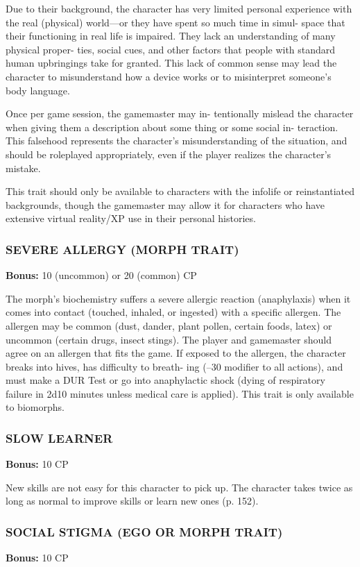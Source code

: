 Due to their background, the character has very
limited personal experience with the real (physical)
world—or they have spent so much time in simul-
space that their functioning in real life is impaired.
They lack an understanding of many physical proper-
ties, social cues, and other factors that people with
standard human upbringings take for granted. This
lack of common sense may lead the character to
misunderstand how a device works or to misinterpret
someone’s body language.

Once per game session, the gamemaster may in-
tentionally mislead the character when giving them
a description about some thing or some social in-
teraction. This falsehood represents the character’s
misunderstanding of the situation, and should be
roleplayed appropriately, even if the player realizes
the character’s mistake.

This trait should only be available to characters
with the infolife or reinstantiated backgrounds,
though the gamemaster may allow it for characters
who have extensive virtual reality/XP use in their
personal histories.
\subsubsection{SEVERE ALLERGY (MORPH TRAIT)}
\textbf{Bonus:} 10 (uncommon) or 20 (common) CP

The morph’s biochemistry suffers a severe allergic
reaction (anaphylaxis) when it comes into contact
(touched, inhaled, or ingested) with a specific allergen.
The allergen may be common (dust, dander, plant pollen,
certain foods, latex) or uncommon (certain drugs, insect
stings). The player and gamemaster should agree on an
allergen that fits the game. If exposed to the allergen,
the character breaks into hives, has difficulty to breath-
ing (–30 modifier to all actions), and must make a DUR
Test or go into anaphylactic shock (dying of respiratory
failure in 2d10 minutes unless medical care is applied).
This trait is only available to biomorphs.

\subsubsection{SLOW LEARNER}
\textbf{Bonus:} 10 CP

New skills are not easy for this character to pick
up. The character takes twice as long as normal to
improve skills or learn new ones (p. 152).

\subsubsection{SOCIAL STIGMA (EGO OR MORPH TRAIT)}
\textbf{Bonus:} 10 CP

